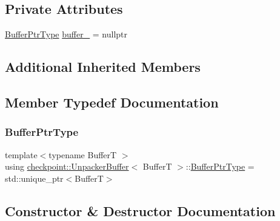 \subsection*{Private Attributes}
\begin{DoxyCompactItemize}
\item 
\hyperlink{structcheckpoint_1_1_unpacker_buffer_acdd2460fdb60fc584e04cb4069060613}{Buffer\+Ptr\+Type} \hyperlink{structcheckpoint_1_1_unpacker_buffer_a0e10a816952c340efd057727e91fe6fa}{buffer\+\_\+} = nullptr
\end{DoxyCompactItemize}
\subsection*{Additional Inherited Members}


\subsection{Member Typedef Documentation}
\mbox{\label{structcheckpoint_1_1_unpacker_buffer_acdd2460fdb60fc584e04cb4069060613}} 
\subsubsection{\texorpdfstring{Buffer\+Ptr\+Type}{BufferPtrType}}
{\footnotesize\ttfamily template$<$typename BufferT $>$ \\
using \hyperlink{structcheckpoint_1_1_unpacker_buffer}{checkpoint\+::\+Unpacker\+Buffer}$<$ BufferT $>$\+::\hyperlink{structcheckpoint_1_1_unpacker_buffer_acdd2460fdb60fc584e04cb4069060613}{Buffer\+Ptr\+Type} =  std\+::unique\+\_\+ptr$<$BufferT$>$}



\subsection{Constructor \& Destructor Documentation}
\mbox{\label{structcheckpoint_1_1_unpacker_buffer_a38d2f76f492c5dad5ab59747a6169e18}} 
